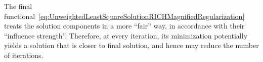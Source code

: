 The final
functional~\ref{eq:UnweightedLeastSquareSolutionRICHMagnifiedRegularization}
treats the solution components in a more ``fair'' way, in accordance with their
``influence strength''. Therefore, at every iteration, its minimization
potentially yields a solution that is closer to final solution, and hence may
reduce the number of iterations.

